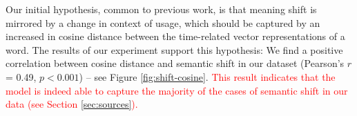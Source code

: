 

Our initial hypothesis, common to previous work, is that meaning shift
is mirrored by a change in context of usage, which should be captured
by an increased in cosine distance between the time-related vector
representations of a word. The results of our experiment
support this hypothesis: We find a positive correlation between cosine
distance and semantic shift in our dataset (Pearson's $r$= 0.49,
$p<0.001$) -- see Figure \ref{fig:shift-cosine}. \textcolor{red}{This
  result indicates that the model is indeed able to capture the
  majority of the cases of semantic shift in our data (see Section
  \ref{sec:sources}).}  

